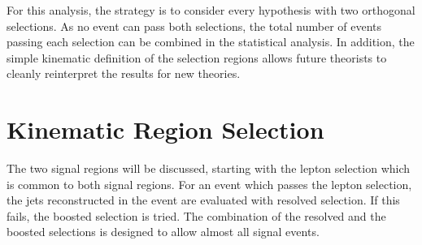 For this analysis, the strategy is to consider every \WRNR hypothesis with two orthogonal selections. 
As no event can pass both selections, the total number of events passing each selection can be combined in the statistical analysis. In addition, the simple kinematic definition of the selection regions allows future theorists to cleanly reinterpret the results for new theories.

\section{Kinematic Region Selection}
The two signal regions will be discussed, starting with the lepton selection which is common to both signal regions. For an event which passes the lepton selection, the jets reconstructed in the event are evaluated with resolved selection. If this fails, the boosted selection is tried. The combination of the resolved and the boosted selections is designed to allow almost all signal events.





